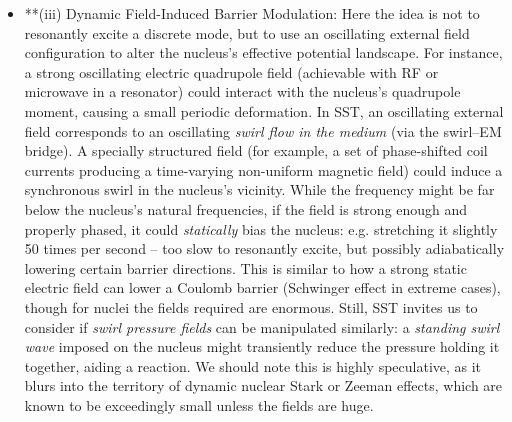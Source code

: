 \documentclass[11pt]{article}
\begin{document}
\begin{itemize}
\item 
**(iii) Dynamic Field-Induced Barrier Modulation: Here the idea is not to resonantly excite a discrete mode, but to use an oscillating external field configuration to alter the nucleus’s effective potential landscape. For instance, a strong oscillating electric quadrupole field (achievable with RF or microwave in a resonator) could interact with the nucleus’s quadrupole moment, causing a small periodic deformation. In SST, an oscillating external field corresponds to an oscillating \textit{swirl flow in the medium} (via the swirl–EM bridge). A specially structured field (for example, a set of phase-shifted coil currents producing a time-varying non-uniform magnetic field) could induce a synchronous swirl in the nucleus’s vicinity. While the frequency might be far below the nucleus’s natural frequencies, if the field is strong enough and properly phased, it could \textit{statically} bias the nucleus: e.g. stretching it slightly 50 times per second – too slow to resonantly excite, but possibly adiabatically lowering certain barrier directions. This is similar to how a strong static electric field can lower a Coulomb barrier (Schwinger effect in extreme cases), though for nuclei the fields required are enormous. Still, SST invites us to consider if \textit{swirl pressure fields} can be manipulated similarly: a \textit{standing swirl wave} imposed on the nucleus might transiently reduce the pressure holding it together, aiding a reaction. We should note this is highly speculative, as it blurs into the territory of dynamic nuclear Stark or Zeeman effects, which are known to be exceedingly small unless the fields are huge.





\end{itemize}
\end{document}
